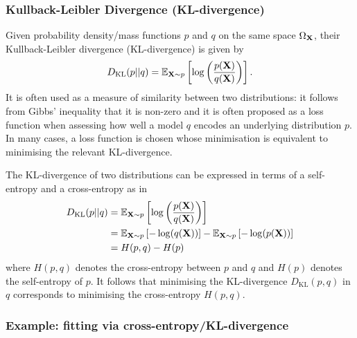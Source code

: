 \documentclass[11pt]{article}
\begin{document}
\begin{appendices}
\subsubsection{Kullback-Leibler Divergence (KL-divergence)}

Given probability density/mass functions $p$ and $q$ on the same space $\Omega_{\mathbf{X}}$, their Kullback-Leibler divergence (KL-divergence) is given by
$$
D_{\text{KL}}(p||q)
=
\mathbb{E}_{\mathbf{X}\sim p}\left[\log\left(\frac{p(\mathbf{X})}{q(\mathbf{X})}\right)\right].
$$
It is often used as a measure of similarity between two distributions: it follows from Gibbs' inequality that it is non-zero and it is often proposed as a loss function when assessing how well a model $q$ encodes an underlying distribution $p$. In many cases, a loss function is chosen whose minimisation is equivalent to minimising the relevant KL-divergence.

The KL-divergence of two distributions can be expressed in terms of a self-entropy and a cross-entropy as in
\begin{align*}
    D_{\text{KL}}(p||q)
    &=
    \mathbb{E}_{\mathbf{X}\sim p}\left[\log\left(\frac{p(\mathbf{X})}{q(\mathbf{X})}\right)\right]\\
    &=
    \mathbb{E}_{\mathbf{X}\sim p}\left[-\log(q(\mathbf{X}))\right]-\mathbb{E}_{\mathbf{X}\sim p}\left[-\log(p(\mathbf{X}))\right]\\
    &=
    H(p,q)-H(p)
\end{align*}
where $H(p,q)$ denotes the cross-entropy between $p$ and $q$ and $H(p)$ denotes the self-entropy of $p$. It follows that minimising the KL-divergence $D_{\text{KL}}(p,q)$ in $q$ corresponds to minimising the cross-entropy $H(p,q)$.

\subsubsection*{Example: fitting via cross-entropy/KL-divergence}


\end{appendices}
\end{document}
